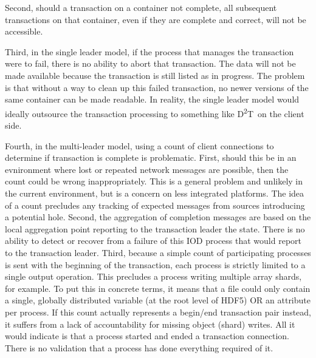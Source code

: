 \documentclass[conference]{sig-alt-gov2}
\newcommand{\DDT}{D\textsuperscript{2}T~}
\begin{document}
Second, should a transaction on a container not complete, all subsequent
transactions on that container, even if they are complete and correct, will not
be accessible.

Third, in the single leader model, if the process that manages the transaction
were to fail, there is no ability to abort that transaction. The data will not
be made available because the transaction is still listed as in progress. The
problem is that without a way to clean up this failed transaction, no newer
versions of the same container can be made readable. In reality, the single
leader model would ideally outsource the transaction processing to something
like \DDT on the client side.

Fourth, in the multi-leader model, using a count of client connections to
determine if transaction is complete is problematic.  First, should this be in
an evnironment where lost or repeated network messages are possible, then the
count could be wrong inappropriately. This is a general problem and unlikely
in the current environment, but is a concern on less integrated platforms.
The idea of a count precludes any tracking of expected messages from sources
introducing a potential hole. Second, the aggregation of completion messages
are based on the local aggregation point reporting to the transaction
leader the state.  There is no ability to detect or recover from a failure of
this IOD process that would report to the transaction leader. Third, because a
simple count of participating processes is sent with the beginning of the
transaction, each process is strictly limited to a single output operation.
This precludes a process writing multiple array shards, for example. To put
this in concrete terms, it means that a file could only contain a single,
globally distributed variable (at the root level of HDF5) OR an attribute per
process. If this count actually represents a begin/end transaction pair
instead, it suffers from a lack of accountability for missing object (shard)
writes. All it would indicate is that a process started and ended a transaction
connection. There is no validation that a process has done everything required
of it.
\end{document}
